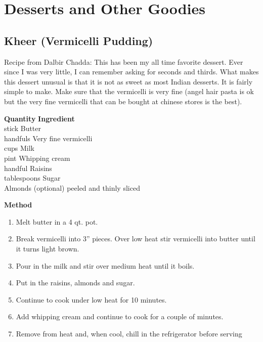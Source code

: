 \chapter{Desserts and Other Goodies}

\section{Kheer (Vermicelli Pudding)}

  Recipe from Dalbir Chadda:  
This has been my all time favorite dessert.  Ever since I was  very  little,  I
can remember asking for seconds and thirds.  What makes this dessert unusual is
that it is not as sweet as most Indian desserts.  It is fairly simple to  make.
Make sure that the vermicelli is very fine (angel hair pasta is ok but the very
fine vermicelli that can be bought at chinese stores is the best).

\begin{tabbing}
\hspace{1.0cm}  \={\bf Quantity}   \hspace{3.0cm} \={\bf Ingredient}\\
    stick \>Butter\\
    handfuls \>Very fine vermicelli\\
    cups \> Milk\\
    pint \>Whipping cream\\
    handful \>Raisins\\
    tablespoons \>Sugar\\
    \>Almonds (optional) peeled and thinly sliced\\
\end{tabbing}

{\bf Method}
\begin{enumerate}
   \item Melt butter in a 4 qt. pot.
   \item Break vermicelli into 3'' pieces.  Over low heat stir  vermicelli
      into butter until it turns light brown.
   \item Pour in the milk and stir over medium heat until it boils.
   \item Put in the raisins, almonds and sugar.
   \item Continue to cook under low heat for 10 minutes.
   \item Add whipping cream and continue to cook for a couple of minutes.
   \item Remove  from  heat  and,  when cool, chill in the refrigerator before
      serving
\end{enumerate}


